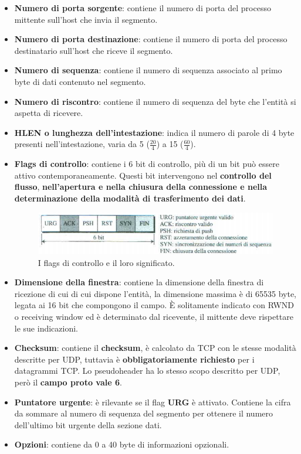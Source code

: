 \documentclass[11pt,a4paper]{article}
\theoremstyle{definition}
\begin{document}
\begin{itemize}
	\item \textbf{Numero di porta sorgente}: contiene il numero di porta del processo mittente sull'host che invia il segmento.
	\item \textbf{Numero di porta destinazione}: contiene il numero di porta del processo destinatario sull'host che riceve il segmento.
	\item \textbf{Numero di sequenza}: contiene il numero di sequenza associato al primo byte di dati contenuto nel segmento.
	\item \textbf{Numero di riscontro}: contiene il numero di sequenza del byte che l'entità si aspetta di ricevere.
	\item \textbf{HLEN o lunghezza dell'intestazione}: indica il numero di parole di 4 byte presenti nell'intestazione, varia da 5 ($\frac{20}{4}$) a 15 ($\frac{60}{4}$).
	\item \textbf{Flags di controllo}: contiene i 6 bit di controllo, più di un bit può essere attivo contemporaneamente. Questi bit intervengono nel \textbf{controllo del flusso}, \textbf{nell'apertura e nella chiusura della connessione e nella determinazione della modalità di trasferimento dei dati}.
	      \begin{figure}[!h]
		      \includegraphics[scale=0.5]{Immagini/TCP_flags.png}
		      \centering
		      \caption{I flags di controllo e il loro significato.}
	      \end{figure}
	\item \textbf{Dimensione della finestra}: contiene la dimensione della finestra di ricezione di cui di cui dispone l'entità, la dimensione massima è di 65535 byte, legata ai 16 bit che compongono il campo. È solitamente indicato con RWND o receiving window ed è determinato dal ricevente, il mittente deve rispettare le sue indicazioni.
	\item \textbf{Checksum}: contiene il \textbf{checksum}, è calcolato da TCP con le stesse modalità descritte per UDP, tuttavia è \textbf{obbligatoriamente richiesto} per i datagrammi TCP. Lo pseudoheader ha lo stesso scopo descritto per UDP, però il \textbf{campo proto vale 6}.
	\item \textbf{Puntatore urgente}: è rilevante se il flag \textbf{URG} è attivato. Contiene la cifra da sommare al numero di sequenza del segmento per ottenere il numero dell'ultimo bit urgente della sezione dati.
	\item \textbf{Opzioni}: contiene da 0 a 40 byte di informazioni opzionali.
\end{itemize}
\end{document}
